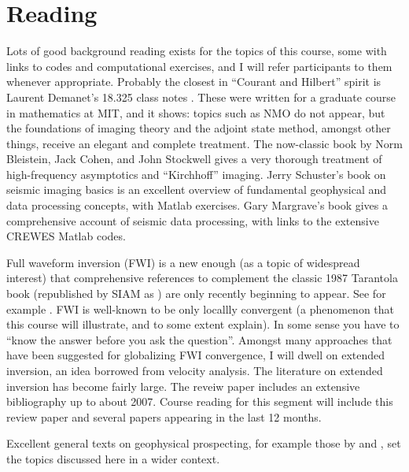 \section{Reading}
Lots of good background reading exists for the topics of this course, some with links to codes and computational exercises, and I will refer participants to them whenever appropriate. Probably the closest in ``Courant and Hilbert'' spirit is Laurent Demanet's 18.325 class notes \cite[]{Demanet:325notes}. These were written for a graduate course in mathematics at MIT, and it shows: topics such as NMO do not appear, but the foundations of imaging theory and the adjoint state method, amongst other things, receive an elegant and complete treatment. The now-classic book by Norm Bleistein, Jack Cohen, and John Stockwell \cite[]{BleisteinCohenStockwell:01} gives a very thorough treatment of high-frequency asymptotics and ``Kirchhoff'' imaging.  Jerry Schuster's book on seismic imaging basics \cite[]{Schuster:10} is an excellent overview of fundamental geophysical and data processing concepts, with Matlab exercises. Gary Margrave's book \cite[]{Margrave:book} gives a comprehensive account of seismic data processing, with links to the extensive CREWES Matlab codes. 

Full waveform inversion (FWI) is a new enough (as a topic of widespread interest) that comprehensive references to complement the classic 1987 Tarantola book (republished by SIAM as \cite[]{Tarantola:05}) are only recently beginning to appear. See for example \cite{Fichtner:10}. FWI is well-known to be only locallly convergent (a phenomenon that this course will illustrate, and to some extent explain). In some sense you have to ``know the answer before you ask the question''.  Amongst many approaches that have been suggested for globalizing FWI convergence, I will dwell on extended inversion, an idea borrowed from velocity analysis. The literature on extended inversion has become fairly large. The reveiw paper \cite{geoprosp:2008} includes an extensive bibliography up to about 2007. Course reading for this segment will include this review paper and several papers appearing in the last 12 months. 

Excellent general texts on geophysical prospecting, for example those by \cite{Yil:01} and \cite{DobSav:88}, set the topics discussed here in a wider context. 

